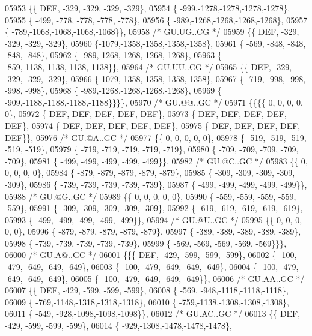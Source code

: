 \begin{DoxyCode}
05953 \{\{  DEF, -329, -329, -329, -329\},
05954 \{ -999,-1278,-1278,-1278,-1278\},
05955 \{ -499, -778, -778, -778, -778\},
05956 \{ -989,-1268,-1268,-1268,-1268\},
05957 \{ -789,-1068,-1068,-1068,-1068\}\},
05958 \textcolor{comment}{/* GU.UG..CG */}
05959 \{\{  DEF, -329, -329, -329, -329\},
05960 \{-1079,-1358,-1358,-1358,-1358\},
05961 \{ -569, -848, -848, -848, -848\},
05962 \{ -989,-1268,-1268,-1268,-1268\},
05963 \{ -859,-1138,-1138,-1138,-1138\}\},
05964 \textcolor{comment}{/* GU.UU..CG */}
05965 \{\{  DEF, -329, -329, -329, -329\},
05966 \{-1079,-1358,-1358,-1358,-1358\},
05967 \{ -719, -998, -998, -998, -998\},
05968 \{ -989,-1268,-1268,-1268,-1268\},
05969 \{ -909,-1188,-1188,-1188,-1188\}\}\}\},
05970 \textcolor{comment}{/* GU.@@..GC */}
05971 \{\{\{\{    0,    0,    0,    0,    0\},
05972 \{  DEF,  DEF,  DEF,  DEF,  DEF\},
05973 \{  DEF,  DEF,  DEF,  DEF,  DEF\},
05974 \{  DEF,  DEF,  DEF,  DEF,  DEF\},
05975 \{  DEF,  DEF,  DEF,  DEF,  DEF\}\},
05976 \textcolor{comment}{/* GU.@A..GC */}
05977 \{\{    0,    0,    0,    0,    0\},
05978 \{ -519, -519, -519, -519, -519\},
05979 \{ -719, -719, -719, -719, -719\},
05980 \{ -709, -709, -709, -709, -709\},
05981 \{ -499, -499, -499, -499, -499\}\},
05982 \textcolor{comment}{/* GU.@C..GC */}
05983 \{\{    0,    0,    0,    0,    0\},
05984 \{ -879, -879, -879, -879, -879\},
05985 \{ -309, -309, -309, -309, -309\},
05986 \{ -739, -739, -739, -739, -739\},
05987 \{ -499, -499, -499, -499, -499\}\},
05988 \textcolor{comment}{/* GU.@G..GC */}
05989 \{\{    0,    0,    0,    0,    0\},
05990 \{ -559, -559, -559, -559, -559\},
05991 \{ -309, -309, -309, -309, -309\},
05992 \{ -619, -619, -619, -619, -619\},
05993 \{ -499, -499, -499, -499, -499\}\},
05994 \textcolor{comment}{/* GU.@U..GC */}
05995 \{\{    0,    0,    0,    0,    0\},
05996 \{ -879, -879, -879, -879, -879\},
05997 \{ -389, -389, -389, -389, -389\},
05998 \{ -739, -739, -739, -739, -739\},
05999 \{ -569, -569, -569, -569, -569\}\}\},
06000 \textcolor{comment}{/* GU.A@..GC */}
06001 \{\{\{  DEF, -429, -599, -599, -599\},
06002 \{ -100, -479, -649, -649, -649\},
06003 \{ -100, -479, -649, -649, -649\},
06004 \{ -100, -479, -649, -649, -649\},
06005 \{ -100, -479, -649, -649, -649\}\},
06006 \textcolor{comment}{/* GU.AA..GC */}
06007 \{\{  DEF, -429, -599, -599, -599\},
06008 \{ -569, -948,-1118,-1118,-1118\},
06009 \{ -769,-1148,-1318,-1318,-1318\},
06010 \{ -759,-1138,-1308,-1308,-1308\},
06011 \{ -549, -928,-1098,-1098,-1098\}\},
06012 \textcolor{comment}{/* GU.AC..GC */}
06013 \{\{  DEF, -429, -599, -599, -599\},
06014 \{ -929,-1308,-1478,-1478,-1478\},

\end{DoxyCode}
